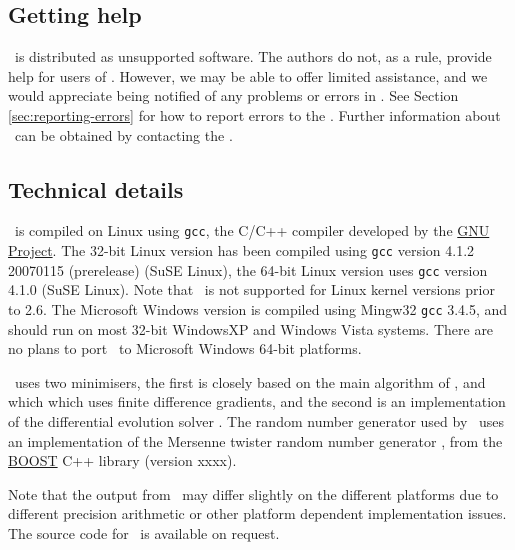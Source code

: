 \subsection{Getting help}

\SPM\ is distributed as unsupported software. The authors do not, as a rule, provide help for users of \SPM. However, we may be able to offer limited assistance, and we would appreciate being notified of any problems or errors in \SPM. See Section \ref{sec:reporting-errors} for how to report errors to the \authors. Further information about \SPM\ can be obtained by contacting the \authors.

\subsection{Technical details}

\SPM\ is compiled on Linux using \texttt{gcc}, the C/C++ compiler developed by the \href{http://gcc.gnu.org}{GNU Project}. The 32-bit Linux version has been compiled using \texttt{gcc} version 4.1.2 20070115 (prerelease) (SuSE Linux), the 64-bit Linux version uses \texttt{gcc} version 4.1.0 (SuSE Linux). Note that \SPM\ is not supported for Linux kernel versions prior to 2.6. The Microsoft Windows version is compiled using Mingw32 \texttt{gcc} 3.4.5, and should run on most 32-bit WindowsXP and Windows Vista systems. There are no plans to port \SPM\ to Microsoft Windows 64-bit platforms. 

\SPM\ uses two minimisers, \textemdash the first is closely based on the main algorithm of \cite{779}, and which which uses finite difference gradients, and the second is an implementation of the differential evolution solver \citep{1442}. The random number generator used by \SPM\ uses an implementation of the Mersenne twister random number generator \citep{796}, from the \href{http://www.boost.org/}{BOOST} C++ library (version xxxx).

Note that the output from \SPM\ may differ slightly on the different platforms due to different precision arithmetic or other platform dependent implementation issues. The source code for \SPM\ is available on request.


